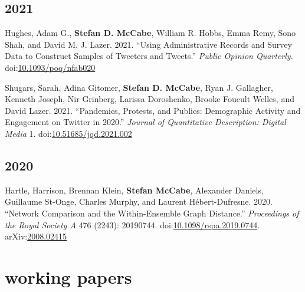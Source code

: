 \documentclass[11pt, letter]{article}
\begin{document}
\subsection{2021}
\begin{hangparas}{.25in}{1}
Hughes, Adam G.,\textsuperscript{\textdagger} \textbf{Stefan D.
McCabe},\textsuperscript{\textdagger} William R. Hobbs, Emma Remy, Sono
Shah, and David M. J. Lazer. 2021. ``Using Administrative Records and Survey
Data to Construct Samples of Tweeters and Tweets.'' \textit{Public Opinion
Quarterly}.
doi:\href{https://doi.org/10.1093/poq/nfab020}{10.1093/poq/nfab020}
\vspace{2mm}

Shugars, Sarah, Adina Gitomer, \textbf{Stefan D. McCabe}, Ryan J. Gallagher,
Kenneth Joseph, Nir Grinberg, Larissa Doroshenko, Brooke Foucult Welles, and
David Lazer. 2021. ``Pandemics, Protests, and Publics: Demographic Activity and
Engagement on Twitter in 2020.'' \textit{Journal of Quantitative Description:
  Digital Media} 1.
doi:\href{https://doi.org/10.51685/jqd.2021.002}{10.51685/jqd.2021.002}
\end{hangparas}

\subsection{2020}
\begin{hangparas}{.25in}{1}
  Hartle, Harrison, Brennan Klein, \textbf{Stefan McCabe}, Alexander Daniels,
  Guillaume St-Onge, Charles Murphy, and Laurent Hébert-Dufresne. 2020.
  ``Network Comparison and the Within-Ensemble Graph Distance.''
  \textit{Proceedings of the Royal Society A} 476 (2243): 20190744.
  doi:\href{https://doi.org/10.1098/rspa.2019.0744}{10.1098/rspa.2019.0744}.
  arXiv:\href{https://arxiv.org/abs/2008.02415}{2008.02415} \vspace{2mm}
\end{hangparas}

\section{working papers}
\end{document}
